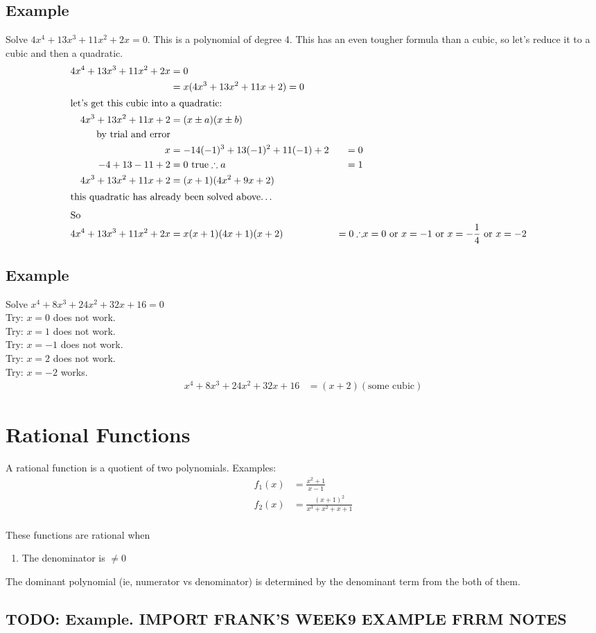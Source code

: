 \subsection{Example}
Solve $4x^4 +13x^3 +11x^2 +2x = 0$. This is a polynomial of degree 4. This has
an even tougher formula than a cubic, so let's reduce it to a cubic and then a
quadratic.
\begin{align}
  4x^4 +13x^3 +11x^2 +2x &= 0 \\
  &= x(4x^3 +13x^2 +11x +2) =0 \\
\intertext{let's get this cubic into a quadratic:}
  4x^3 +13x^2 +11x +2 &= (x \pm a)(x \pm b) \\
  \text{by trial and error} \nonumber \\
  x &= -1
  4(-1)^3 +13(-1)^2 +11(-1) +2 &= 0 \\
  -4 +13 -11 +2 &= 0 ~\text{true}
  \therefore a &= 1 \\
  4x^3 +13x^2 +11x +2 &= (x+1)(4x^2 +9x +2) \\
\intertext{this quadratic has already been solved above\ldots}
\intertext{So}
  4x^4 +13x^3 +11x^2 +2x &= x(x+1)(4x+1)(x+2) &= 0
\therefore & x=0 ~\text{or} ~ x=-1 ~\text{or} ~ x=-\frac{1}{4} ~\text{or} ~ x =-2
\end{align}

\subsection{Example}
Solve $x^4 +8x^3 +24x^2 +32x +16 =0$ \\
Try: $x=0$ does not work. \\
Try: $x=1$ does not work. \\
Try: $x=-1$ does not work. \\
Try: $x=2$ does not work. \\
Try: $x=-2$ works. \\
\begin{align}
  x^4 +8x^3 +24x^2 +32x +16 &= (x+2)(\text{some cubic})
\end{align}

\section{Rational Functions}
A rational function is a quotient of two polynomials. Examples:
\begin{align}
  f_1(x) &= \frac{x^2+1}{x-1} \\
  f_2(x) &= \frac{(x+1)^2}{x^3 +x^2 +x +1} \\
\end{align}

\noindent These functions are rational when
\begin{enumerate}
  \item The denominator is $\neq 0$
\end{enumerate}

\noindent The dominant polynomial (ie, numerator vs denominator) is determined
by the denominant term from the both of them.

\subsection{TODO: Example. IMPORT FRANK'S WEEK9 EXAMPLE FRRM NOTES}
\lipsum[1]